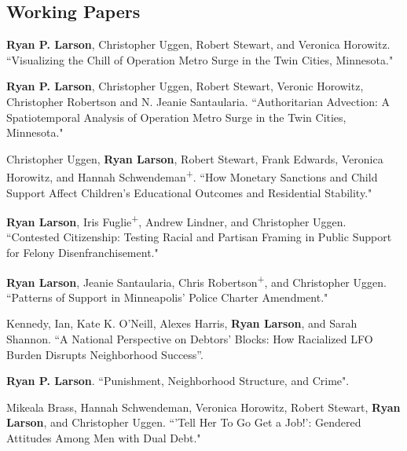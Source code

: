 \documentclass[letterpaper]{article}
\newenvironment{publist}{%
  \begin{list}{}{%
    \setlength{\leftmargin}{0cm}   %
    \setlength{\labelwidth}{2cm}     %
    \setlength{\labelsep}{0.5cm}     %
  }%
}{%
  \end{list}%
}
\begin{document}
\subsection*{Working Papers}
\begin{publist}


\item \textbf{Ryan P. Larson}, Christopher Uggen, Robert Stewart, and Veronica Horowitz. ``Visualizing the Chill of Operation Metro Surge in the Twin Cities, Minnesota." 

\item \textbf{Ryan P. Larson}, Christopher Uggen, Robert Stewart, Veronic Horowitz, Christopher Robertson and N. Jeanie Santaularia. ``Authoritarian Advection: A Spatiotemporal Analysis of Operation Metro Surge in the Twin Cities, Minnesota."

\item Christopher Uggen, \textbf{Ryan Larson}, Robert Stewart, Frank Edwards, Veronica Horowitz, and Hannah Schwendeman\textsuperscript{+}. ``How Monetary Sanctions and Child Support Affect Children's Educational Outcomes and Residential Stability."

\item \textbf{Ryan Larson}, Iris Fuglie\textsuperscript{+}, Andrew Lindner, and Christopher Uggen. ``Contested Citizenship: Testing Racial and Partisan Framing in Public Support for Felony Disenfranchisement."

\item \textbf{Ryan Larson}, Jeanie Santaularia, Chris Robertson\textsuperscript{+}, and Christopher Uggen. ``Patterns of Support in Minneapolis’ Police Charter Amendment." 

\item Kennedy, Ian, Kate K. O’Neill, Alexes Harris, \textbf{Ryan Larson}, and Sarah Shannon. ``A National Perspective on Debtors’ Blocks: How Racialized LFO Burden Disrupts Neighborhood Success”.
  
\item \textbf{Ryan P. Larson}. ``Punishment, Neighborhood Structure, and Crime".

\item Mikeala Brass, Hannah Schwendeman, Veronica Horowitz, Robert Stewart, \textbf{Ryan Larson}, and Christopher Uggen. ``'Tell Her To Go Get a Job!': Gendered Attitudes Among Men with Dual Debt."



\end{publist}
\end{document}
